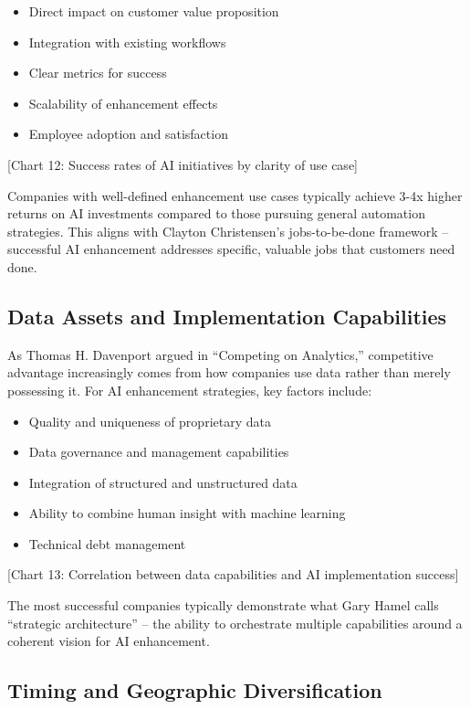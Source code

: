 \documentclass[
  Letterpaper,
]{scrbook}
\providecommand{\tightlist}{%
  \setlength{\itemsep}{0pt}\setlength{\parskip}{0pt}}\usepackage{longtable,booktabs,array}
\begin{document}
\begin{itemize}
\tightlist
\item
  Direct impact on customer value proposition
\item
  Integration with existing workflows
\item
  Clear metrics for success
\item
  Scalability of enhancement effects
\item
  Employee adoption and satisfaction
\end{itemize}

{[}Chart 12: Success rates of AI initiatives by clarity of use case{]}

Companies with well-defined enhancement use cases typically achieve 3-4x
higher returns on AI investments compared to those pursuing general
automation strategies. This aligns with Clayton Christensen's
jobs-to-be-done framework -- successful AI enhancement addresses
specific, valuable jobs that customers need done.

\subsection{Data Assets and Implementation
Capabilities}\label{data-assets-and-implementation-capabilities}

As Thomas H. Davenport argued in ``Competing on Analytics,'' competitive
advantage increasingly comes from how companies use data rather than
merely possessing it. For AI enhancement strategies, key factors
include:

\begin{itemize}
\tightlist
\item
  Quality and uniqueness of proprietary data
\item
  Data governance and management capabilities
\item
  Integration of structured and unstructured data
\item
  Ability to combine human insight with machine learning
\item
  Technical debt management
\end{itemize}

{[}Chart 13: Correlation between data capabilities and AI implementation
success{]}

The most successful companies typically demonstrate what Gary Hamel
calls ``strategic architecture'' -- the ability to orchestrate multiple
capabilities around a coherent vision for AI enhancement.

\subsection{Timing and Geographic
Diversification}\label{timing-and-geographic-diversification}
\end{document}
